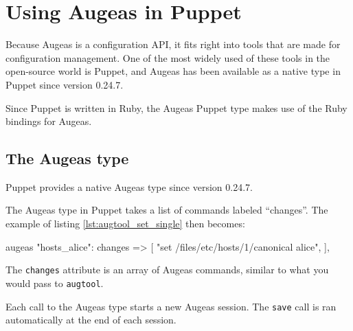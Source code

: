 \chapter{Using Augeas in Puppet}



Because Augeas is a configuration API, it fits right into tools that are made for configuration management. One of the most widely used of these tools in the open-source world is Puppet, and Augeas has been available as a native type in Puppet since version 0.24.7.

Since Puppet is written in Ruby, the Augeas Puppet type makes use of the Ruby bindings for Augeas.

\section{The Augeas type}

Puppet provides a native Augeas type since version 0.24.7.

 The Augeas type in Puppet takes a list of commands labeled ``changes''. The example of listing \ref{lst:augtool_set_single} then becomes:

\begin{puppet-augeas}[]
augeas { "hosts_alice":
   changes => [
      "set /files/etc/hosts/1/canonical alice",
   ],
}
\end{puppet-augeas}

The \verb!changes! attribute is an array of Augeas commands, similar to what you would pass to \verb!augtool!.

\begin{quote}

\end{quote}
 Each call to the Augeas type starts a new Augeas session. The \verb!save! call is ran automatically at the end of each session.

